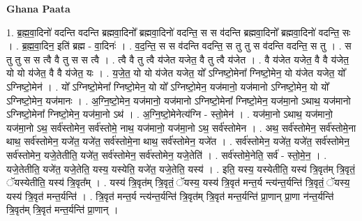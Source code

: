 \documentclass[17pt]{extarticle}
\begin{document}
\textbf{Ghana Paata } \newline

1. ब्र॒ह्म॒वा॒दिनो॑ वदन्ति वदन्ति ब्रह्मवा॒दिनो᳚ ब्रह्मवा॒दिनो॑ वदन्ति॒ स स व॑दन्ति ब्रह्मवा॒दिनो᳚ ब्रह्मवा॒दिनो॑ वदन्ति॒ सः । . ब्र॒ह्म॒वा॒दिन॒ इति॑ ब्रह्म - वा॒दिनः॑ । . व॒द॒न्ति॒ स स व॑दन्ति वदन्ति॒ स तु तु स व॑दन्ति वदन्ति॒ स तु । . स तु तु स स त्वै वै तु स स त्वै । . त्वै वै तु त्वै य॑जेत यजेत॒ वै तु त्वै य॑जेत । . वै य॑जेत यजेत॒ वै वै य॑जेत॒ यो यो य॑जेत॒ वै वै य॑जेत॒ यः । . य॒जे॒त॒ यो यो य॑जेत यजेत॒ यो᳚ ऽग्निष्टो॒मेना᳚ ग्निष्टो॒मेन॒ यो य॑जेत यजेत॒ यो᳚ ऽग्निष्टो॒मेन॑ । . यो᳚ ऽग्निष्टो॒मेना᳚ ग्निष्टो॒मेन॒ यो यो᳚ ऽग्निष्टो॒मेन॒ यज॑मानो॒ यज॑मानो ऽग्निष्टो॒मेन॒ यो यो᳚ ऽग्निष्टो॒मेन॒ यज॑मानः । . अ॒ग्नि॒ष्टो॒मेन॒ यज॑मानो॒ यज॑मानो ऽग्निष्टो॒मेना᳚ ग्निष्टो॒मेन॒ यज॑मा॒नो ऽथाथ॒ यज॑मानो ऽग्निष्टो॒मेना᳚ ग्निष्टो॒मेन॒ यज॑मा॒नो ऽथ॑ । . अ॒ग्नि॒ष्टो॒मेनेत्य॑ग्नि - स्तो॒मेन॑ । . यज॑मा॒नो ऽथाथ॒ यज॑मानो॒ यज॑मा॒नो ऽथ॒ सर्व॑स्तोमेन॒ सर्व॑स्तोमे॒ नाथ॒ यज॑मानो॒ यज॑मा॒नो ऽथ॒ सर्व॑स्तोमेन । . अथ॒ सर्व॑स्तोमेन॒ सर्व॑स्तोमे॒ना थाथ॒ सर्व॑स्तोमेन॒ यजे॑त॒ यजे॑त॒ सर्व॑स्तोमे॒ना थाथ॒ सर्व॑स्तोमेन॒ यजे॑त । . सर्व॑स्तोमेन॒ यजे॑त॒ यजे॑त॒ सर्व॑स्तोमेन॒ सर्व॑स्तोमेन॒ यजे॒तेतीति॒ यजे॑त॒ सर्व॑स्तोमेन॒ सर्व॑स्तोमेन॒ यजे॒तेति॑ । . सर्व॑स्तोमे॒नेति॒ सर्व॑ - स्तो॒मे॒न॒ । . यजे॒तेतीति॒ यजे॑त॒ यजे॒तेति॒ यस्य॒ यस्येति॒ यजे॑त॒ यजे॒तेति॒ यस्य॑ । . इति॒ यस्य॒ यस्येतीति॒ यस्य॑ त्रि॒वृत॑म् त्रि॒वृतं॒ ॅयस्येतीति॒ यस्य॑ त्रि॒वृत᳚म् । . यस्य॑ त्रि॒वृत॑म् त्रि॒वृतं॒ ॅयस्य॒ यस्य॑ त्रि॒वृत॑ मन्त॒र्य न्त्य॑न्त॒र्यन्ति॑ त्रि॒वृतं॒ ॅयस्य॒ यस्य॑ त्रि॒वृत॑ मन्त॒र्यन्ति॑ । . त्रि॒वृत॑ मन्त॒र्य न्त्य॑न्त॒र्यन्ति॑ त्रि॒वृत॑म् त्रि॒वृत॑ मन्त॒र्यन्ति॑ प्रा॒णान् प्रा॒णा न॑न्त॒र्यन्ति॑ त्रि॒वृत॑म् त्रि॒वृत॑ मन्त॒र्यन्ति॑ प्रा॒णान् । \newline
\end{document}
